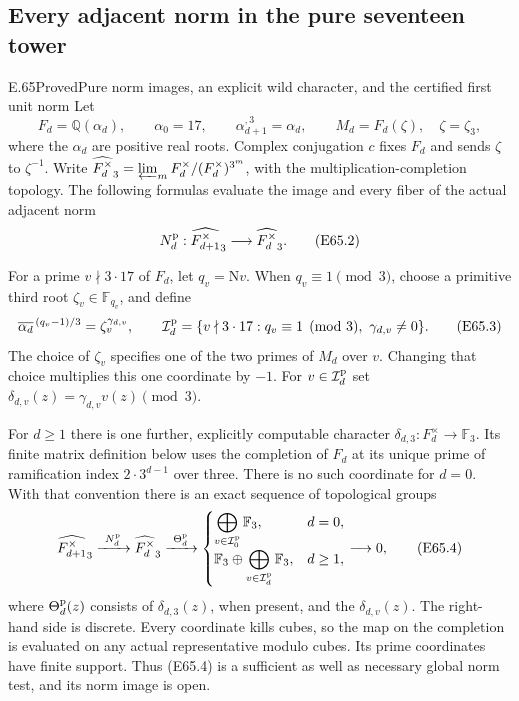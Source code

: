 \subsection{Every adjacent norm in the pure seventeen tower}

\begin{statement}{E.65}{Proved}{Pure norm images, an explicit wild character, and the certified first unit norm}
Let
\[
 F_d=\mathbb Q(\alpha_d),\qquad \alpha_0=17,\qquad
 \alpha_{d+1}^{,3}=\alpha_d,\qquad
 M_d=F_d(\zeta),\quad \zeta=\zeta_3,
 \tag{E65.1}
\]
where the $\alpha_d$ are positive real roots. Complex conjugation $c$
fixes $F_d$ and sends $\zeta$ to $\zeta^{-1}$.
Write $\widehat{F_d^\times}_3=\varprojlim_m
F_d^\times/(F_d^\times)^{3^m}$, with the multiplication-completion
topology. The following formulas evaluate the image and every fiber of
the actual adjacent norm
\[
 N_d^{\rm p}:\widehat{F_{d+1}^\times}_3
                    \longrightarrow\widehat{F_d^\times}_3.
 \tag{E65.2}
\]

For a prime $v\nmid3\cdot17$ of $F_d$, let $q_v=\mathrm Nv$.
When $q_v\equiv1\pmod3$, choose a primitive third root
$\zeta_v\in\mathbb F_{q_v}$, and define
\[
 \overline{\alpha_d}^{\,(q_v-1)/3}
             =\zeta_v^{\gamma_{d,v}},\qquad
 \mathcal I_d^{\rm p}=
 \{v\nmid3\cdot17:q_v\equiv1\pmod3,
                         \ \gamma_{d,v}\ne0\}.
 \tag{E65.3}
\]
The choice of $\zeta_v$ specifies one of the two primes of $M_d$ over
$v$. Changing that choice multiplies this one coordinate by $-1$.
For $v\in\mathcal I_d^{\rm p}$ set
$\delta_{d,v}(z)=\gamma_{d,v}v(z)\pmod3$.

For $d\ge1$ there is one further, explicitly computable character
$\delta_{d,3}:F_d^\times\to\mathbb F_3$.
Its finite matrix definition below uses the completion of $F_d$ at
its unique prime of ramification index $2\cdot3^{d-1}$ over three.
There is no such coordinate for $d=0$.
With that convention there is an exact sequence of topological groups
\[
 \widehat{F_{d+1}^\times}_3
 \xrightarrow{\ N_d^{\rm p}\ }
 \widehat{F_d^\times}_3
 \xrightarrow{\ \Theta_d^{\rm p}\ }
 \begin{cases}
   \displaystyle\bigoplus_{v\in\mathcal I_0^{\rm p}}\mathbb F_3,
                                                        &d=0,\\[2mm]
   \displaystyle\mathbb F_3\oplus
                \bigoplus_{v\in\mathcal I_d^{\rm p}}\mathbb F_3,
                                                        &d\ge1,
 \end{cases}
 \longrightarrow0,
 \tag{E65.4}
\]
where $\Theta_d^{\rm p}(z)$ consists of $\delta_{d,3}(z)$, when
present, and the $\delta_{d,v}(z)$. The right-hand side is discrete.
Every coordinate kills cubes, so the map on the completion is
evaluated on any actual representative modulo cubes. Its prime
coordinates have finite support. Thus (E65.4) is a sufficient as well
as necessary global norm test, and its norm image is open.


\end{statement}
